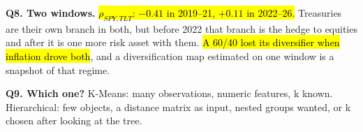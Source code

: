 \documentclass[10pt,a4paper]{article}
\newcommand{\q}[1]{\textbf{\color{blue!50!black}#1}}
\begin{document}
\q{Q8. Two windows.} \hl{$\rho_{SPY,TLT}$: $-0.41$ in 2019--21, $+0.11$ in 2022--26.} Treasuries are their own
branch in both, but before 2022 that branch is the hedge to equities and after it is one more risk asset with them.
\hl{A 60/40 lost its diversifier when inflation drove both}, and a diversification map estimated on one window is a
snapshot of that regime.

\q{Q9. Which one?} K-Means: many observations, numeric features, k known. Hierarchical: few objects, a distance
matrix as input, nested groups wanted, or k chosen after looking at the tree.
\end{document}

